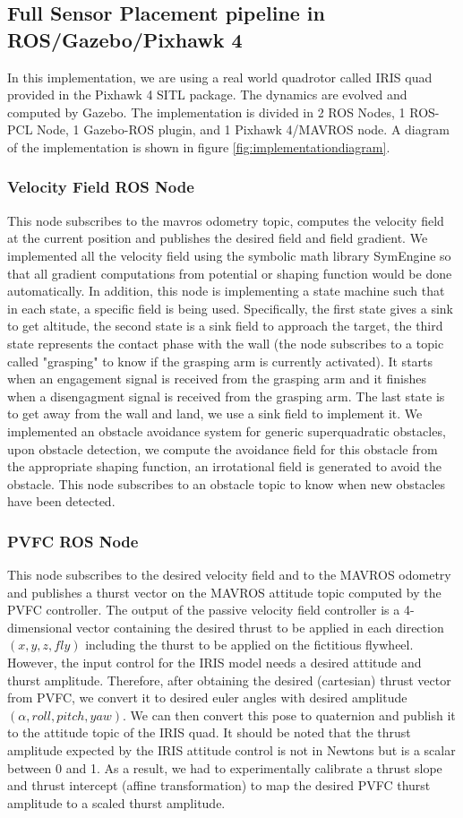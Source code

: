 \subsection{Full Sensor Placement pipeline in ROS/Gazebo/Pixhawk 4}
In this implementation, we are using a real world quadrotor called IRIS quad provided in the Pixhawk 4 SITL package. 
The dynamics are evolved and computed by Gazebo. 
The implementation is divided in 2 ROS Nodes, 1 ROS-PCL Node, 1 Gazebo-ROS plugin, and 1 Pixhawk 4/MAVROS node.
A diagram of the implementation is shown in figure \ref{fig:implementationdiagram}.
\subsubsection{Velocity Field ROS Node}
This node subscribes to the mavros odometry topic, computes the velocity field at the current position and publishes the desired field and field gradient. 
We implemented all the velocity field using the symbolic math library SymEngine so that all gradient computations from potential or shaping function would be done automatically. 
In addition, this node is implementing a state machine such that in each state, a specific field is being used.
Specifically, the first state gives a sink to get altitude, the second state is a sink field to approach the target, 
the third state represents the contact phase with the wall (the node subscribes to a topic called "grasping" to know if the grasping arm is currently activated). It starts when an engagement signal is received from the grasping arm and it finishes when a disengagment signal is received from the grasping arm. 
The last state is to get away from the wall and land, we use a sink field to implement it.
We implemented an obstacle avoidance system for generic superquadratic obstacles, upon obstacle detection, we compute the avoidance field for this obstacle from the appropriate shaping function, an irrotational field is generated to avoid the obstacle. This node subscribes to an obstacle topic to know when new obstacles have been detected. 
\subsubsection{PVFC ROS Node}
This node subscribes to the desired velocity field and to the MAVROS odometry and publishes a thurst vector on the MAVROS attitude topic computed by the PVFC controller. The output of the passive velocity field controller is a 4-dimensional vector containing the desired thrust to be applied in each direction $(x,y,z, fly)$ including the thurst to be applied on the fictitious flywheel. 
However, the input control for the IRIS model needs a desired attitude and thurst amplitude. Therefore, after obtaining the desired (cartesian) thrust vector from PVFC, we convert it to desired euler angles with desired amplitude $(\alpha, roll, pitch, yaw)$. 
We can then convert this pose to quaternion and publish it to the attitude topic of the IRIS quad.
It should be noted that the thrust amplitude expected by the IRIS attitude control is not in Newtons but is a scalar between 0 and 1. As a result, we had to experimentally calibrate a thrust slope and thrust intercept (affine transformation) to map the desired PVFC thurst amplitude to a scaled thurst amplitude. 
